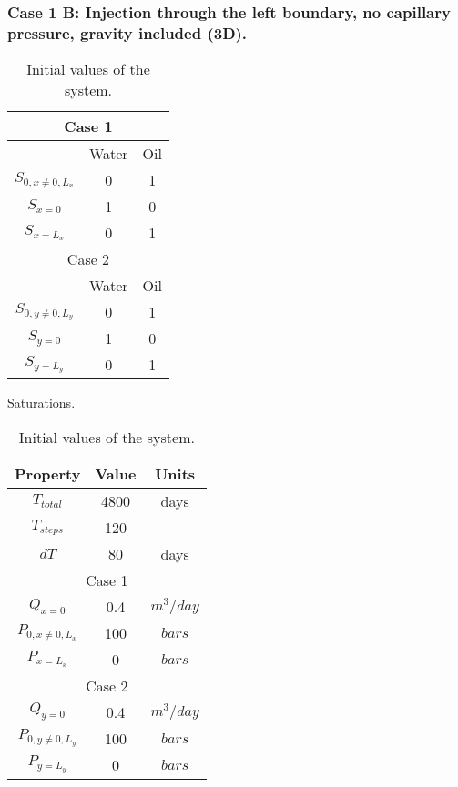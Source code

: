 \documentclass[12pt]{article}
\begin{document}
\subsubsection*{Case 1 B: Injection through the left boundary, no capillary pressure, gravity included (3D).}
\begin{table}[!ht]
\begin{minipage}{.4\textwidth}
\centering
\begin{tabular}{ |c|c|c|} 
\hline
\multicolumn{3}{|c|}{Case 1}\\
\hline
&Water&Oil\\
\hline
$S_{0,x\neq 0, L_x}$&0&1\\
$S_{x=0}$&1&0\\
$S_{x=L_x}$&0&1\\
\hline
\multicolumn{3}{|c|}{Case 2}\\
\hline
&Water&Oil\\
\hline
$S_{0,y\neq 0, L_y}$&0&1\\
$S_{y=0}$&1&0\\
$S_{y=L_y}$&0&1\\
\hline
\end{tabular}
\caption{Saturations.}\label{table:sat}
\end{minipage}%
\hspace{1cm}
\begin{minipage}{.4\textwidth}
\centering
\begin{tabular}{ |c|c|c|} 
\hline
Property&Value&Units\\
\hline
    $T_{total}$&     4800& days\\
    $T_{steps}$& 120&\\
$dT$& 80&days\\
\hline
\multicolumn{3}{|c|}{Case 1}\\
\hline
$Q_{x=0}$&0.4&$m^3/day$\\
$P_{0,x\neq 0, L_x}$&100&$bars$\\
$P_{x=L_x}$&0&$bars$\\
\hline
\multicolumn{3}{|c|}{Case 2}\\
 \hline
 $Q_{y=0}$&0.4&$m^3/day$\\
$P_{0,y\neq 0, L_y}$&100&$bars$\\
$P_{y=L_y}$&0&$bars$\\
\hline
\end{tabular}\caption{Initial values of the system.}
\label{table:ic}
\end{minipage}
\end{table} 
\end{document}
